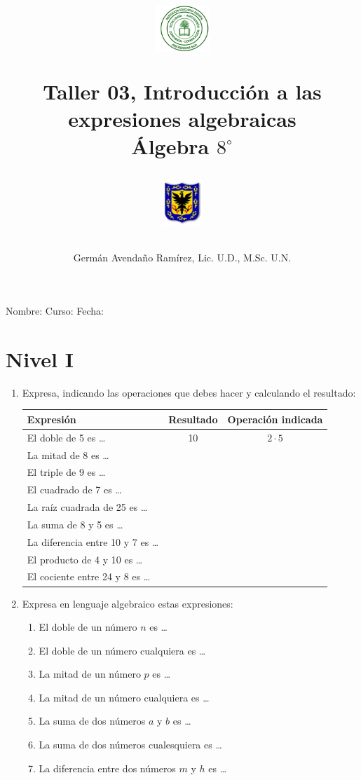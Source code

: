 \documentclass[10pt,twoside]{article}
\author{Germ\'an Avenda\~no Ram\'irez, Lic. U.D., M.Sc. U.N.}
\title{\begin{minipage}{.2\textwidth}
\includegraphics[height=1.75cm]{Images/logo-colegio.png}\end{minipage}
\begin{minipage}{.55\textwidth}
\begin{center}
Taller 03, Introducción a las expresiones algebraicas\\
Álgebra $8^{\circ}$
\end{center}
\end{minipage}\hfill
\begin{minipage}{.2\textwidth}
\includegraphics[height=1.75cm]{Images/logo-sed.png} 
\end{minipage}}
\date{}
\begin{document}
\maketitle
Nombre: \hrulefill Curso: \underline{\hspace*{44pt}} Fecha: \underline{\hspace*{2.5cm}}
 \section*{Nivel I}
 \begin{enumerate}
 \item Expresa, indicando las operaciones que debes hacer y calculando el resultado: 
\begin{center}
\begin{tabular}{|l|c|c|}
\hline 
\hspace*{.5cm}Expresión & Resultado & Operación indicada \\ 
\hline 
El doble de 5 es \ldots & 10 & $2\cdot 5$ \\ 
\hline 
La mitad de 8 es \ldots &  &  \\ 
\hline 
El triple de 9 es \ldots &  &  \\ 
\hline 
El cuadrado de 7 es \ldots &  & \\ 
\hline 
La raíz cuadrada de 25 es \ldots &  &  \\ 
\hline 
La suma de 8 y 5 es \ldots &  &  \\ 
\hline 
La diferencia entre 10 y 7 es \ldots &  &  \\ 
\hline 
El producto de 4 y 10 es \ldots &  &  \\ 
\hline 
El cociente entre 24 y 8 es \ldots &  &  \\ 
\hline 
\end{tabular} 
\end{center}
\item Expresa en lenguaje algebraico estas expresiones:
\begin{enumerate}
\item El doble de un número $n$ es \ldots {}
\item El doble de un número cualquiera es \ldots
\item La mitad de un número $p$ es \ldots
\item La mitad de un número cualquiera es \ldots
\item La suma de dos números $a$ y $b$ es \ldots
\item La suma de dos números cualesquiera es \ldots
\item La diferencia entre dos números $m$ y $h$ es \ldots

\end{enumerate}
\end{enumerate}
\end{document}
